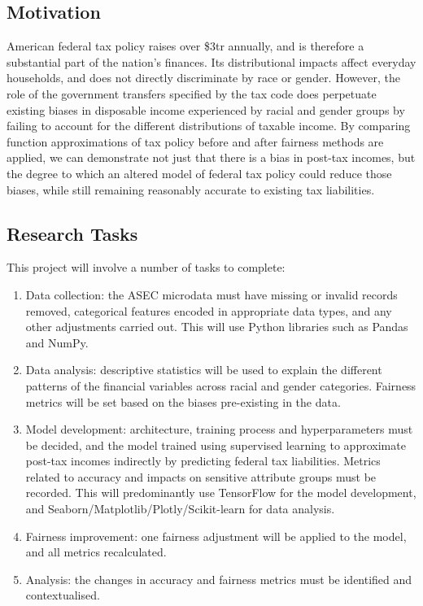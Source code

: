 \documentclass[conference]{IEEEtran}
\begin{document}
\subsection{Motivation}
American federal tax policy raises over \$3tr annually, and is therefore a substantial part of the nation's finances. Its distributional impacts affect everyday households, and does not directly discriminate by race or gender. However, the role of the government transfers specified by the tax code does perpetuate existing biases in disposable income experienced by racial and gender groups by failing to account for the different distributions of taxable income. By comparing function approximations of tax policy before and after fairness methods are applied, we can demonstrate not just that there is a bias in post-tax incomes, but the degree to which an altered model of federal tax policy could reduce those biases, while still remaining reasonably accurate to existing tax liabilities.
\subsection{Research Tasks}
This project will involve a number of tasks to complete:
\begin{enumerate}
    \item Data collection: the ASEC microdata must have missing or invalid records removed, categorical features encoded in appropriate data types, and any other adjustments carried out. This will use Python libraries such as Pandas and NumPy.
    \item Data analysis: descriptive statistics will be used to explain the different patterns of the financial variables across racial and gender categories. Fairness metrics will be set based on the biases pre-existing in the data.
    \item Model development: architecture, training process and hyperparameters must be decided, and the model trained using supervised learning to approximate post-tax incomes indirectly by predicting federal tax liabilities. Metrics related to accuracy and impacts on sensitive attribute groups must be recorded. This will predominantly use TensorFlow for the model development, and Seaborn/Matplotlib/Plotly/Scikit-learn for data analysis.
    \item Fairness improvement: one fairness adjustment will be applied to the model, and all metrics recalculated.
    \item Analysis: the changes in accuracy and fairness metrics must be identified and contextualised.
\end{enumerate}
\end{document}

